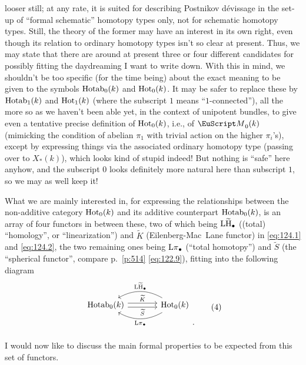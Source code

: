 looser still; at any rate, it is suited for describing Postnikov
dévissage in the set-up of ``formal schematic'' homotopy types only,
not for schematic homotopy types. Still, the theory of the former may
have an interest in its own right, even though its relation to
ordinary homotopy types isn't so clear at present. Thus, we may state
that there are around at present three or four different candidates
for possibly fitting the daydreaming I want to write down.
With this in mind, we shouldn't be too specific (for the time being)
about the exact meaning to be given to the symbols $\operatorname{Hotab}_0(k)$ and
$\operatorname{Hot}_0(k)$. It may be safer to replace these by $\operatorname{Hotab}_1(k)$ and
$\operatorname{Hot}_1(k)$ (where the subscript $1$ means ``$1$-connected''), all
the more so as we haven't been able yet, in the context of unipotent
bundles, to give even a tentative precise definition of $\operatorname{Hot}_0(k)$,
i.e., of $\scrM_0(k)$ (mimicking the condition of abelian $\pi_1$ with
trivial action on the higher $\pi_i$'s), except by expressing things
via the associated ordinary homotopy type (passing over to $X_*(k)$),
which looks kind of stupid indeed! But nothing is ``safe'' here
anyhow, and the subscript $0$ looks definitely more natural here than
subscript $1$, so we may as well keep it!

\bigbreak

\noindent\hfill{}\par

What we are mainly interested in, for expressing the relationships
between the non-additive category $\operatorname{Hot}_0(k)$ and its additive
counterpart $\operatorname{Hotab}_0(k)$, is an array of four functors in between
these, two of which being $\operatorname{L\widetilde H}_\bullet$ ((total) ``homology'', or
``linearization'') and $\widetilde K$ (Eilenberg-Mac~Lane functor) in
\eqref{eq:124.1} and \eqref{eq:124.2}, the two remaining ones being
$\operatorname{L\pi}_\bullet$ (``total homotopy'') and $\widetilde S$ (the
``spherical functor'', compare p.~\ref{p:514} \eqref{eq:122.9}),
fitting into the following diagram
\begin{equation}
  \label{eq:124.4}
  \begin{tabular}{@{}c@{}}
    \begin{tikzcd}[baseline=(O.base),sep=large]
      \HotabOf_0(k) \ar[r,shift left,"\widetilde K"]
      \ar[r,shift right,"\widetilde S"'] &
      \HotOf_0(k) \ar[l,bend right,"\LtH_\bullet"{swap}]
      \ar[l,bend left,"\Lpi_\bullet"{name=O}] \\
    \end{tikzcd}.
  \end{tabular}\tag{4}
\end{equation}
I would now like to discuss the main formal properties to be expected
from this set of functors.

